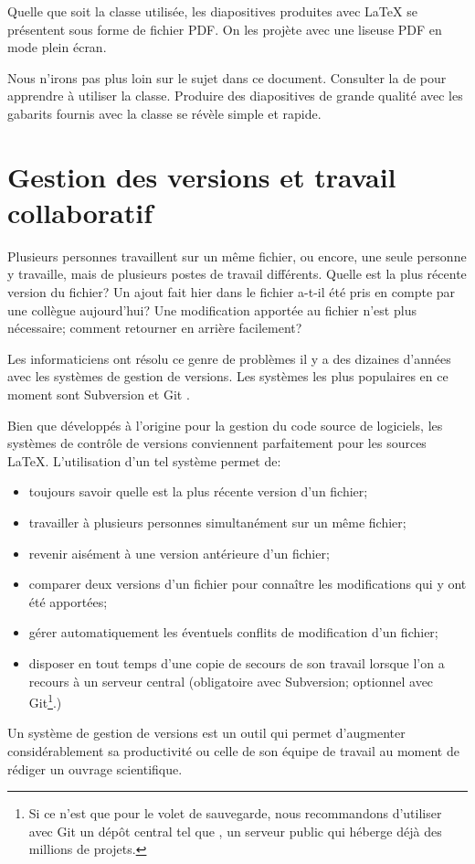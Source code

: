 Quelle que soit la classe utilisée, les diapositives produites avec
{\LaTeX} se présentent sous forme de fichier PDF. On les projète avec
une liseuse PDF en mode plein écran.

Nous n'irons pas plus loin sur le sujet dans ce document. Consulter
la %
de  pour apprendre à utiliser la classe. Produire des
diapositives de grande qualité avec les gabarits fournis avec la
classe se révèle simple et rapide.



\section{Gestion des versions et travail collaboratif}
\label{sec:trucs:cvs}

Plusieurs personnes travaillent sur un même fichier, ou encore, une
seule personne y travaille, mais de plusieurs postes de travail
différents. Quelle est la plus récente version du fichier? Un ajout
fait hier dans le fichier a-t-il été pris en compte par une collègue
aujourd'hui? Une modification apportée au fichier n'est plus
nécessaire; comment retourner en arrière facilement?

Les informaticiens ont résolu ce genre de problèmes il y a des
dizaines d'années avec les systèmes de gestion de versions. Les
systèmes les plus populaires en ce moment sont Subversion
\citep{subversion} et Git \citep{git}.

Bien que développés à l'origine pour la gestion du code source de
logiciels, les systèmes de contrôle de versions conviennent
parfaitement pour les sources {\LaTeX}. L'utilisation d'un tel système
permet de:
\begin{itemize}
\item toujours savoir quelle est la plus récente version d'un fichier;
\item travailler à plusieurs personnes simultanément sur un même
  fichier;
\item revenir aisément à une version antérieure d'un fichier;
\item comparer deux versions d'un fichier pour connaître les
  modifications qui y ont été apportées;
\item gérer automatiquement les éventuels conflits de modification
  d'un fichier;
\item disposer en tout temps d'une copie de secours de son travail
  lorsque l'on a recours à un serveur central (obligatoire avec
  Subversion; optionnel avec Git\footnote{%
    Si ce n'est que pour le volet de sauvegarde, nous recommandons
    d'utiliser avec Git un dépôt central tel que
    , un serveur public qui héberge
    déjà des millions de projets.}.)
\end{itemize}
Un système de gestion de versions est un outil qui permet d'augmenter
considérablement sa productivité ou celle de son équipe de
travail au moment de rédiger un ouvrage scientifique.

